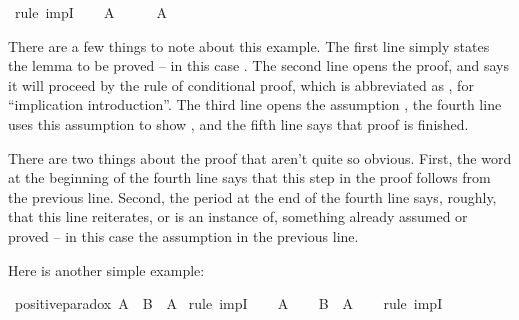\begin{isabellebody}
%
\isadelimproof
%
\endisadelimproof
%
\isatagproof
{}\isamarkupfalse%
\ {\isacharparenleft}rule\ impI{\isacharparenright}\isanewline
\ \ \isamarkupfalse%
\ {\isachardoublequoteopen}A{\isachardoublequoteclose}\isanewline
\ \ \isamarkupfalse%
\ \isamarkupfalse%
\ {\isachardoublequoteopen}A{\isachardoublequoteclose}\isacommand{{\isachardot}}\isamarkupfalse%
\isanewline
{}\isamarkupfalse%
%
\endisatagproof
{\isafoldproof}%
%
\isadelimproof
%
\endisadelimproof
%
\begin{isamarkuptext}%
There are a few things to note about this example. The first line simply states the lemma to
be proved -- in this case . The second line opens the proof, and says it will proceed
by the rule of conditional proof, which is abbreviated as , for ``implication 
introduction''. The third line opens the assumption , the fourth line uses this assumption
to show , and the fifth line says that proof is finished.%
\end{isamarkuptext}\isamarkuptrue%
%
\begin{isamarkuptext}%
There are two things about the proof that aren't quite so obvious. First, the word 
at the beginning of the fourth line says that this step in the proof follows from the previous line.
Second, the period at the end of the fourth line says, roughly, that this line reiterates, or is an
instance of, something already assumed or proved -- in this case the assumption in the previous line.%
\end{isamarkuptext}\isamarkuptrue%
%
\begin{isamarkuptext}%
Here is another simple example:%
\end{isamarkuptext}\isamarkuptrue%
\isamarkupfalse%
\ positive{\isacharunderscore}paradox{\isacharcolon}\ {\isachardoublequoteopen}A\ {\isasymlongrightarrow}\ B\ {\isasymlongrightarrow}\ A{\isachardoublequoteclose}\isanewline
%
\isadelimproof
%
\endisadelimproof
%
\isatagproof
{}\isamarkupfalse%
\ {\isacharparenleft}rule\ impI{\isacharparenright}\isanewline
\ \ \isamarkupfalse%
\ {\isachardoublequoteopen}A{\isachardoublequoteclose}\isanewline
\ \ \isamarkupfalse%
\ {\isachardoublequoteopen}B\ {\isasymlongrightarrow}\ A{\isachardoublequoteclose}\isanewline
\ \ \isamarkupfalse%
\ {\isacharparenleft}rule\ impI{\isacharparenright}\isanewline
\ \ \ \ \isamarkupfalse%

\end{isabellebody}
